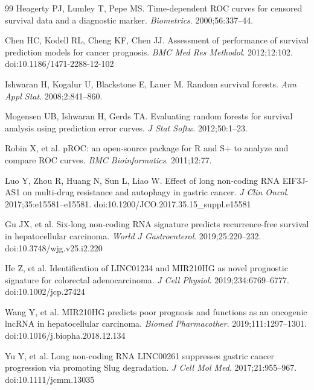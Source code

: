 \documentclass[12pt,a4paper]{article}
\begin{document}
\begin{thebibliography}{99}
 Heagerty PJ, Lumley T, Pepe MS. Time-dependent ROC curves for censored survival data and a diagnostic marker. \textit{Biometrics}. 2000;56:337--44.

 Chen HC, Kodell RL, Cheng KF, Chen JJ. Assessment of performance of survival prediction models for cancer prognosis. \textit{BMC Med Res Methodol}. 2012;12:102. doi:10.1186/1471-2288-12-102

 Ishwaran H, Kogalur U, Blackstone E, Lauer M. Random survival forests. \textit{Ann Appl Stat}. 2008;2:841--860.

 Mogensen UB, Ishwaran H, Gerds TA. Evaluating random forests for survival analysis using prediction error curves. \textit{J Stat Softw}. 2012;50:1--23.

 Robin X, et al. pROC: an open-source package for R and S+ to analyze and compare ROC curves. \textit{BMC Bioinformatics}. 2011;12:77.

 Luo Y, Zhou R, Huang N, Sun L, Liao W. Effect of long non-coding RNA EIF3J-AS1 on multi-drug resistance and autophagy in gastric cancer. \textit{J Clin Oncol}. 2017;35:e15581--e15581. doi:10.1200/JCO.2017.35.15\_suppl.e15581

 Gu JX, et al. Six-long non-coding RNA signature predicts recurrence-free survival in hepatocellular carcinoma. \textit{World J Gastroenterol}. 2019;25:220--232. doi:10.3748/wjg.v25.i2.220

 He Z, et al. Identification of LINC01234 and MIR210HG as novel prognostic signature for colorectal adenocarcinoma. \textit{J Cell Physiol}. 2019;234:6769--6777. doi:10.1002/jcp.27424

 Wang Y, et al. MIR210HG predicts poor prognosis and functions as an oncogenic lncRNA in hepatocellular carcinoma. \textit{Biomed Pharmacother}. 2019;111:1297--1301. doi:10.1016/j.biopha.2018.12.134

 Yu Y, et al. Long non-coding RNA LINC00261 suppresses gastric cancer progression via promoting Slug degradation. \textit{J Cell Mol Med}. 2017;21:955--967. doi:10.1111/jcmm.13035

\end{thebibliography}
\end{document}
